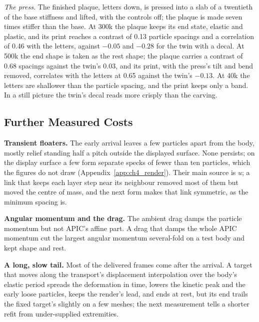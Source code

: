 \textit{The press.} The finished plaque, letters down, is pressed into a slab of a twentieth of the base stiffness and lifted,
with the controls off; the plaque is made seven times stiffer than the base. At 300k the plaque keeps its end state, elastic
and plastic, and its print reaches a contrast of 0.13 particle spacings and a correlation of 0.46 with the letters, against
$-0.05$ and $-0.28$ for the twin with a decal. At 500k the end shape is taken as the rest shape; the plaque carries a
contrast of 0.68 spacings against the twin's 0.03, and its print, with the press's tilt and bend removed, correlates with
the letters at 0.65 against the twin's $-0.13$. At 40k the letters are shallower than the particle spacing, and the print
keeps only a band. In a still picture the twin's decal reads more crisply than the carving.


\subsection{Further Measured Costs}
\label{app:ch4_costs}
\textbf{Transient floaters.} The early arrival leaves a few particles apart from the body, mostly relief standing half a
pitch outside the displayed surface. None persists; on the display surface a few form separate specks of fewer than ten
particles, which the figures do not draw (Appendix~\ref{app:ch4_render}). Their main
source is $u$; a link that keeps each layer step near its neighbour removed most of them but moved the centre of mass, and
the next form makes that link symmetric, as the minimum spacing is.

\textbf{Angular momentum and the drag.} The ambient drag damps the particle momentum but not APIC's affine part. A drag that
damps the whole APIC momentum cut the largest angular momentum several-fold on a test body and kept shape and rest.

\textbf{A long, slow tail.} Most of the delivered frames come after the arrival. A target that moves along the transport's
displacement interpolation over the body's elastic period spreads the deformation in time, lowers the kinetic peak and the
early loose particles, keeps the render's lead, and ends at rest, but its end trails the fixed target's slightly on a few
meshes; the next measurement tells a shorter refit from under-supplied extremities.

